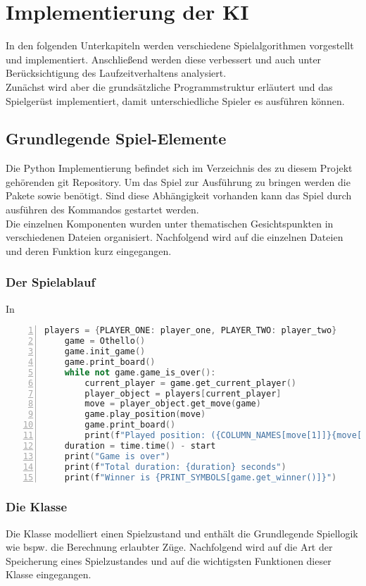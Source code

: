 \chapter{Implementierung der KI}
In den folgenden Unterkapiteln  werden verschiedene Spielalgorithmen vorgestellt und implementiert. Anschließend werden diese verbessert und auch unter Berücksichtigung des Laufzeitverhaltens analysiert.
\\Zunächst wird aber die grundsätzliche Programmstruktur erläutert und das Spielgerüst implementiert, damit unterschiedliche Spieler es ausführen können.
\section{Grundlegende Spiel-Elemente}
Die Python Implementierung befindet sich im Verzeichnis  des zu diesem Projekt gehörenden git Repository. Um das Spiel zur Ausführung zu bringen werden die Pakete  sowie  benötigt. Sind diese Abhängigkeit vorhanden kann das Spiel durch ausführen des Kommandos  gestartet werden.
\\Die einzelnen Komponenten wurden unter thematischen Gesichtspunkten in verschiedenen Dateien organisiert. Nachfolgend wird auf die einzelnen Dateien und deren Funktion kurz eingegangen.
\subsection{Der Spielablauf}
In 
\begin{lstlisting}[caption = {Spielablauf in \mxZitat{main-game.py}}, language = cpp, captionpos = t , numbers=left, label={lst:lst-main-game}]
    players = {PLAYER_ONE: player_one, PLAYER_TWO: player_two}
    game = Othello()
    game.init_game()
    game.print_board()
    while not game.game_is_over():
        current_player = game.get_current_player()
        player_object = players[current_player]
        move = player_object.get_move(game)
        game.play_position(move)
        game.print_board()
        print(f"Played position: ({COLUMN_NAMES[move[1]]}{move[0] + 1})")
    duration = time.time() - start
    print("Game is over")
    print(f"Total duration: {duration} seconds")
    print(f"Winner is {PRINT_SYMBOLS[game.get_winner()]}")
\end{lstlisting}
\subsection{Die Klasse }
Die Klasse  modelliert einen Spielzustand und enthält die Grundlegende Spiellogik wie bspw. die Berechnung erlaubter Züge. Nachfolgend wird auf die Art der Speicherung eines Spielzustandes und auf die wichtigsten Funktionen dieser Klasse eingegangen.

